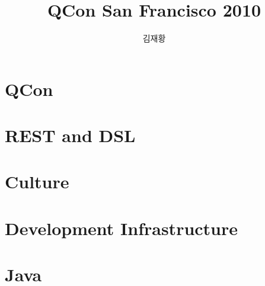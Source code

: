 \documentclass[10pt,unicode,serif,compress,slidetop]{beamer}
\title{QCon San Francisco 2010}
\author{김재황}
\institute{소프트웨어 센터}
\begin{document}
\begin{frame}[plain]
    \titlepage
\end{frame}

\section{QCon}


\section{REST and DSL}



\section{Culture}



\section{Development Infrastructure}



\section{Java}



\end{document}

